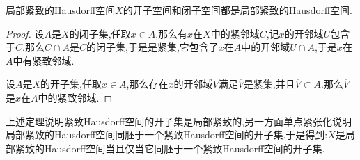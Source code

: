 局部紧致的Hausdorff空间$X$的开子空间和闭子空间都是局部紧致的Hausdorff空间.
\begin{proof}
	
	设$A$是$X$的闭子集,任取$x\in A$,那么有$x$在$X$中的紧邻域$C$,记$x$的开邻域$U$包含于$C$.那么$C\cap A$是$C$的闭子集,于是是紧集,它包含了$x$在$A$中的开邻域$U\cap A$,于是$x$在$A$中有紧致邻域.
	
	设$A$是$X$的开子集,任取$x\in A$,那么存在$x$的开邻域$V$满足$\overline{V}$是紧集,并且$\overline{V}\subset A$.那么$\overline{V}$是$x$在$A$中的紧致邻域.
\end{proof}

上述定理说明紧致Hausdorff空间的开子集是局部紧致的,另一方面单点紧张化说明局部紧致的Hausdorff空间同胚于一个紧致Hausdorff空间的开子集.于是得到:$X$是局部紧致的Hausdorff空间当且仅当它同胚于一个紧致Hausdorff空间的开子集.

